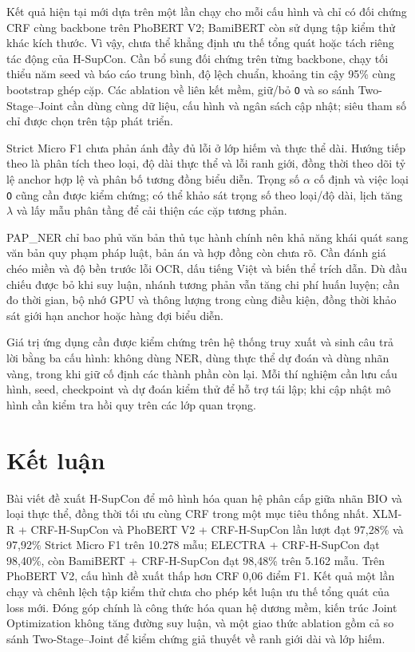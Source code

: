 \documentclass[conference,a4paper]{IEEEtran}
\renewcommand{\refname}{Tài liệu tham khảo}
\begin{document}
Kết quả hiện tại mới dựa trên một lần chạy cho mỗi cấu hình và chỉ có đối
chứng CRF cùng backbone trên PhoBERT V2; BamiBERT còn sử dụng tập kiểm thử
khác kích thước. Vì vậy, chưa thể khẳng định ưu thế tổng quát hoặc tách
riêng tác động của H-SupCon. Cần bổ sung đối chứng trên từng backbone,
chạy tối thiểu năm seed và báo cáo trung bình, độ lệch chuẩn, khoảng tin
cậy 95\% cùng bootstrap ghép cặp. Các ablation về liên kết mềm, giữ/bỏ
\texttt{O} và so sánh Two-Stage--Joint cần dùng cùng dữ liệu, cấu hình và
ngân sách cập nhật; siêu tham số chỉ được chọn trên tập phát triển.

Strict Micro F1 chưa phản ánh đầy đủ lỗi ở lớp hiếm và thực thể dài.
Hướng tiếp theo là phân tích theo loại, độ dài thực thể và lỗi ranh giới,
đồng thời theo dõi tỷ lệ anchor hợp lệ và phân bố tương đồng biểu diễn.
Trọng số $\alpha$ cố định và việc loại \texttt{O} cũng cần được kiểm chứng;
có thể khảo sát trọng số theo loại/độ dài, lịch tăng $\lambda$ và lấy mẫu
phân tầng để cải thiện các cặp tương phản.

PAP\_NER chỉ bao phủ văn bản thủ tục hành chính nên khả năng khái quát
sang văn bản quy phạm pháp luật, bản án và hợp đồng còn chưa rõ. Cần đánh
giá chéo miền và độ bền trước lỗi OCR, dấu tiếng Việt và biến thể trích
dẫn. Dù đầu chiếu được bỏ khi suy luận, nhánh tương phản vẫn tăng chi phí
huấn luyện; cần đo thời gian, bộ nhớ GPU và thông lượng trong cùng điều
kiện, đồng thời khảo sát giới hạn anchor hoặc hàng đợi biểu diễn.

Giá trị ứng dụng cần được kiểm chứng trên hệ thống truy xuất và sinh câu
trả lời bằng ba cấu hình: không dùng NER, dùng thực thể dự đoán và dùng
nhãn vàng, trong khi giữ cố định các thành phần còn lại. Mỗi thí nghiệm
cần lưu cấu hình, seed, checkpoint và dự đoán kiểm thử để hỗ trợ tái lập;
khi cập nhật mô hình cần kiểm tra hồi quy trên các lớp quan trọng.

\section{Kết luận}\label{sec:conclusion}

Bài viết đề xuất H-SupCon để mô hình hóa quan hệ phân cấp giữa nhãn BIO
và loại thực thể, đồng thời tối ưu cùng CRF trong một mục tiêu thống nhất.
XLM-R + CRF-H-SupCon và PhoBERT V2 + CRF-H-SupCon lần lượt đạt 97,28\%
và 97,92\% Strict Micro F1 trên 10.278 mẫu; ELECTRA + CRF-H-SupCon đạt
98,40\%, còn BamiBERT + CRF-H-SupCon đạt 98,48\% trên 5.162 mẫu.
Trên PhoBERT V2, cấu hình đề xuất thấp hơn CRF
0,06 điểm F1. Kết quả một lần chạy và chênh lệch tập kiểm thử chưa cho
phép kết luận ưu thế tổng quát của loss mới. Đóng góp chính là công thức hóa quan hệ dương mềm,
kiến trúc Joint Optimization không tăng đường suy luận, và một giao thức
ablation gồm cả so sánh Two-Stage--Joint để kiểm chứng giả thuyết về ranh
giới dài và lớp hiếm.


\renewcommand{\refname}{Tài liệu tham khảo}

\end{document}
